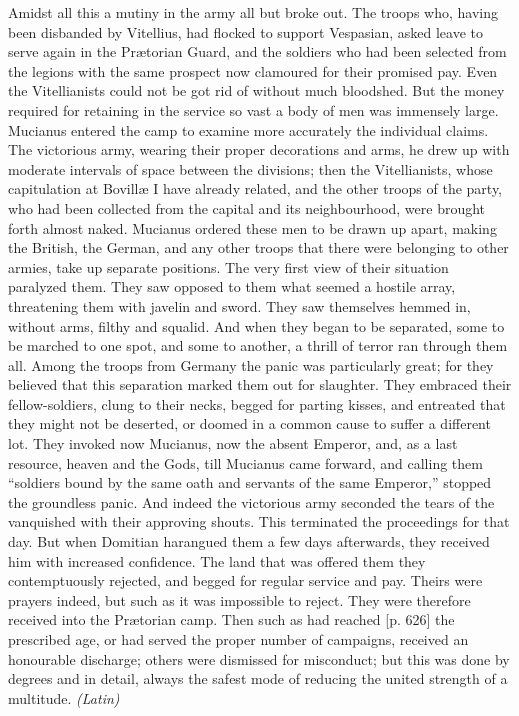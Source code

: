 Amidst all this a mutiny in the army all but broke out. The troops who, having been disbanded by Vitellius, had flocked to support Vespasian, asked leave to serve again in the Prætorian Guard, and the soldiers who had been selected from the legions with the same prospect now clamoured for their promised pay. Even the Vitellianists could not be got rid of without much bloodshed. But the money required for retaining in the service so vast a body of men was immensely large. Mucianus entered the camp to examine more accurately the individual claims. The victorious army, wearing their proper decorations and arms, he drew up with moderate intervals of space between the divisions; then the Vitellianists, whose capitulation at Bovillæ I have already related, and the other troops of the party, who had been collected from the capital and its neighbourhood, were brought forth almost naked. Mucianus ordered these men to be drawn up apart, making the British, the German, and any other troops that there were belonging to other armies, take up separate positions. The very first view of their situation paralyzed them. They saw opposed to them what seemed a hostile array, threatening them with javelin and sword. They saw themselves hemmed in, without arms, filthy and squalid. And when they began to be separated, some to be marched to one spot, and some to another, a thrill of terror ran through them all. Among the troops from Germany the panic was particularly great; for they believed that this separation marked them out for slaughter. They embraced their fellow-soldiers, clung to their necks, begged for parting kisses, and entreated that they might not be deserted, or doomed in a common cause to suffer a different lot. They invoked now Mucianus, now the absent Emperor, and, as a last resource, heaven and the Gods, till Mucianus came forward, and calling them ``soldiers bound by the same oath and servants of the same Emperor,'' stopped the groundless panic. And indeed the victorious army seconded the tears of the vanquished with their approving shouts. This terminated the proceedings for that day. But when Domitian harangued them a few days afterwards, they received him with increased confidence. The land that was offered them they contemptuously rejected, and begged for regular service and pay. Theirs were prayers indeed, but such as it was impossible to reject. They were therefore received into the Prætorian camp. Then such as had reached [p. 626] the prescribed age, or had served the proper number of campaigns, received an honourable discharge; others were dismissed for misconduct; but this was done by degrees and in detail, always the safest mode of reducing the united strength of a multitude. \emph{(Latin)}

